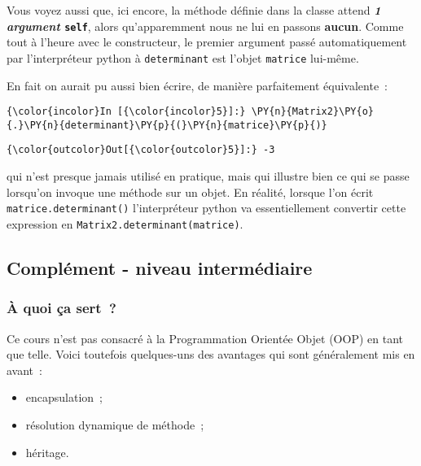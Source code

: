     Vous voyez aussi que, ici encore, la méthode définie dans la classe
attend \textbf{\emph{1 argument} \texttt{self}}, alors qu'apparemment
nous ne lui en passons \textbf{aucun}. Comme tout à l'heure avec le
constructeur, le premier argument passé automatiquement par
l'interpréteur python à \texttt{determinant} est l'objet
\texttt{matrice} lui-même.

En fait on aurait pu aussi bien écrire, de manière parfaitement
équivalente~:

    \begin{Verbatim}[commandchars=\\\{\},frame=single,framerule=0.3mm,rulecolor=\color{cellframecolor}]
{\color{incolor}In [{\color{incolor}5}]:} \PY{n}{Matrix2}\PY{o}{.}\PY{n}{determinant}\PY{p}{(}\PY{n}{matrice}\PY{p}{)}
\end{Verbatim}


\begin{Verbatim}[commandchars=\\\{\},frame=single,framerule=0.3mm,rulecolor=\color{cellframecolor}]
{\color{outcolor}Out[{\color{outcolor}5}]:} -3
\end{Verbatim}
            
    qui n'est presque jamais utilisé en pratique, mais qui illustre bien ce
qui se passe lorsqu'on invoque une méthode sur un objet. En réalité,
lorsque l'on écrit \texttt{matrice.determinant()} l'interpréteur python
va essentiellement convertir cette expression en
\texttt{Matrix2.determinant(matrice)}.

    \hypertarget{compluxe9ment---niveau-intermuxe9diaire}{%
\subsection{Complément - niveau
intermédiaire}\label{compluxe9ment---niveau-intermuxe9diaire}}

    \hypertarget{uxe0-quoi-uxe7a-sert}{%
\subsubsection{À quoi ça sert~?}\label{uxe0-quoi-uxe7a-sert}}

    Ce cours n'est pas consacré à la Programmation Orientée Objet (OOP) en
tant que telle. Voici toutefois quelques-uns des avantages qui sont
généralement mis en avant~:

\begin{itemize}
\tightlist
\item
  encapsulation~;
\item
  résolution dynamique de méthode~;
\item
  héritage.
\end{itemize}

